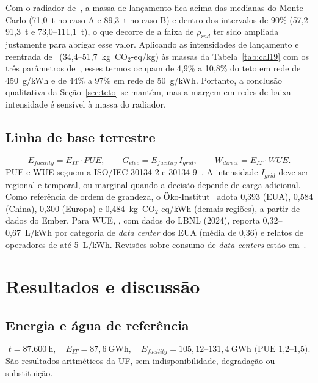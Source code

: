 \documentclass[11pt,a4paper]{article}
\newcommand{\COeq}{\ensuremath{\mathrm{CO_2}\text{-eq}}}
\begin{document}
Com o radiador de~\cite{r19}, a massa de lançamento fica acima das medianas do
Monte Carlo (71,0~t no caso A e 89,3~t no caso B) e dentro dos intervalos de
90\% (57,2--91,3~t e 73,0--111,1~t), o que decorre de a faixa de $\rho_{rad}$
ter sido ampliada justamente para abrigar esse valor. Aplicando as
intensidades de lançamento e reentrada de~\cite{r18} (34,4--51,7~kg~$\COeq$/kg)
às massas da Tabela~\ref{tab:cal19} com os três parâmetros de~\cite{r19}, esses
termos ocupam de 4,9\% a 10,8\% do teto em rede de 450~g/kWh e de 44\% a 97\%
em rede de 50~g/kWh. Portanto, a conclusão qualitativa da
Seção~\ref{sec:teto} se mantém, mas a margem em redes de baixa intensidade é
sensível à massa do radiador.

\subsection{Linha de base terrestre}
\begin{equation}
  E_{facility}=E_{IT}\cdot PUE,\qquad
  G_{elec}=E_{facility}\,I_{grid},\qquad
  W_{direct}=E_{IT}\cdot WUE.
  \label{eq:base}
\end{equation}
PUE e WUE seguem a ISO/IEC 30134-2 e 30134-9~\cite{r41,r42}. A intensidade
$I_{grid}$ deve ser regional e temporal, ou marginal quando a decisão depende
de carga adicional. Como referência de ordem de grandeza, o
Öko-Institut~\cite{r8} adota 0,393 (EUA), 0,584 (China), 0,300 (Europa) e
0,484~kg~$\COeq$/kWh (demais regiões), a partir de dados do Ember. Para WUE,
\cite{r8}, com dados do LBNL (2024), reporta 0,32--0,67~L/kWh por categoria de
\emph{data center} dos EUA (média de 0,36) e relatos de operadores de até
5~L/kWh. Revisões sobre consumo de \emph{data centers} estão em~\cite{r40}.

\section{Resultados e discussão}

\subsection{Energia e água de referência}
\begin{equation}
  t=87.600~\text{h},\quad E_{IT}=87{,}6~\text{GWh},\quad
  E_{facility}=105{,}12\text{--}131{,}4~\text{GWh (PUE 1,2--1,5)}.
  \label{eq:energia}
\end{equation}
São resultados aritméticos da UF, sem indisponibilidade, degradação ou
substituição.
\end{document}
